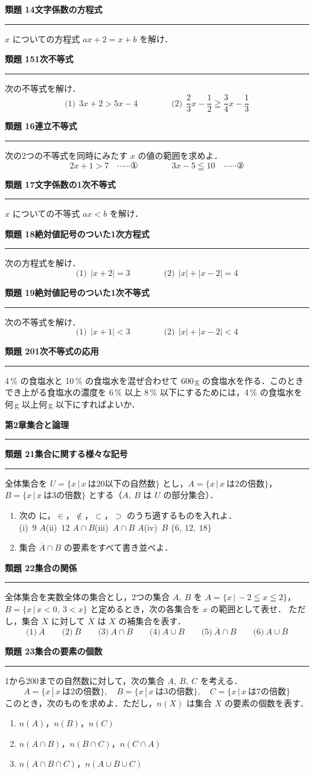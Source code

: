 \documentclass[a4paper,11pt]{ltjsarticle}
\newcommand{\mon}[2]{\Needspace{7\baselineskip}\vspace{10pt}%
  {\sffamily\bfseries 類題 #1\quad #2\par}\vspace{2pt}\hrule\vspace{4pt}}
\newcommand{\shou}[2]{\clearpage\markboth{#1\quad #2}{}%
  {\sffamily\bfseries\LARGE #1\quad #2\par}\vspace{2pt}\hrule height 1.2pt\vspace{4pt}}
\begin{document}
\mon{14}{文字係数の方程式}
$x$ についての方程式 $ax+2=x+b$ を解け．

\mon{15}{1次不等式}
次の不等式を解け．
\[\text{(1)}\ \ 3x+2>5x-4\qquad\qquad \text{(2)}\ \ \frac23x-\frac12\geqq\frac34x-\frac13\]

\mon{16}{連立不等式}
次の2つの不等式を同時にみたす $x$ の値の範囲を求めよ．
\[2x+1>7\quad\cdots\cdots\text{①}\qquad\qquad 3x-5\leqq10\quad\cdots\cdots\text{②}\]

\mon{17}{文字係数の1次不等式}
$x$ についての不等式 $ax<b$ を解け．

\mon{18}{絶対値記号のついた1次方程式}
次の方程式を解け．
\[\text{(1)}\ \ |x+2|=3\qquad\qquad \text{(2)}\ \ |x|+|x-2|=4\]

\mon{19}{絶対値記号のついた1次不等式}
次の不等式を解け．
\[\text{(1)}\ \ |x+1|<3\qquad\qquad \text{(2)}\ \ |x|+|x-2|<4\]

\mon{20}{1次不等式の応用}
4\,\% の食塩水と 10\,\% の食塩水を混ぜ合わせて 600\,g の食塩水を作る．このときでき上がる食塩水の濃度を 6\,\% 以上 8\,\% 以下にするためには，4\,\% の食塩水を何\,g 以上何\,g 以下にすればよいか．


\shou{第2章}{集合と論理}
\mon{21}{集合に関する様々な記号}
全体集合を $U=\{x\,|\,x\ \text{は20以下の自然数}\}$ とし，$A=\{x\,|\,x\ \text{は2の倍数}\}$，$B=\{x\,|\,x\ \text{は3の倍数}\}$ とする（$A,\ B$ は $U$ の部分集合）．
\begin{enumerate}
\item 次の \fbox{\phantom{あ}} に，$\in$，$\notin$，$\subset$，$\supset$ のうち適するものを入れよ．\\
(i)\ $9$ \fbox{\phantom{あ}} $A$\qquad (ii)\ $12$ \fbox{\phantom{あ}} $A\cap B$\qquad (iii)\ $A\cap B$ \fbox{\phantom{あ}} $A$\qquad (iv)\ $B$ \fbox{\phantom{あ}} $\{6,\ 12,\ 18\}$
\item 集合 $\overline A\cap B$ の要素をすべて書き並べよ．
\end{enumerate}

\mon{22}{集合の関係}
全体集合を実数全体の集合とし，2つの集合 $A,\ B$ を
$A=\{x\,|\,-2\leqq x\leqq2\}$，$B=\{x\,|\,x<0,\ 3<x\}$ と定めるとき，次の各集合を $x$ の範囲として表せ．
ただし，集合 $X$ に対して $\overline X$ は $X$ の補集合を表す．
\[\text{(1)}\ \overline A\qquad\text{(2)}\ \overline B\qquad\text{(3)}\ A\cap B\qquad\text{(4)}\ A\cup B\qquad\text{(5)}\ \overline A\cap B\qquad\text{(6)}\ A\cup\overline B\]

\mon{23}{集合の要素の個数}
1から200までの自然数に対して，次の集合 $A,\ B,\ C$ を考える．
\[A=\{x\,|\,x\ \text{は2の倍数}\},\quad B=\{x\,|\,x\ \text{は3の倍数}\},\quad C=\{x\,|\,x\ \text{は7の倍数}\}\]
このとき，次のものを求めよ．ただし，$n(X)$ は集合 $X$ の要素の個数を表す．
\begin{enumerate}
\item $n(A)$，$n(B)$，$n(C)$
\item $n(A\cap B)$，$n(B\cap C)$，$n(C\cap A)$
\item $n(A\cap B\cap C)$，$n(A\cup B\cup C)$
\end{enumerate}
\end{document}
